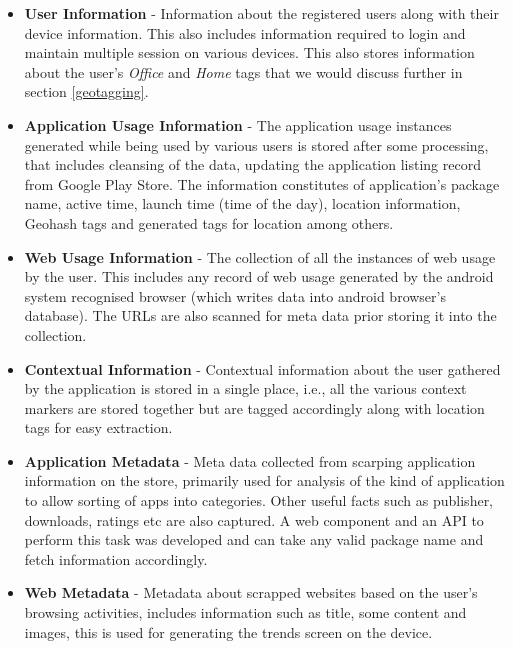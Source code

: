 \documentclass[prodmode,acmtecs]{acmsmall}
\begin{document}
\begin{itemize}

\item \textbf{User Information} - Information about the registered users along with their device information. This also includes information required to login and maintain multiple session on various devices. This also stores information about the user's \textit{Office} and \textit{Home} tags that we would discuss further in section \ref{geotagging}.

\item \textbf{Application Usage Information} - The application usage instances generated while being used by various users is stored after some processing, that includes cleansing of the data, updating the application listing record from Google Play Store. The information constitutes of application's package name, active time, launch time (time of the day), location information, Geohash tags and generated tags for location among others.

\item \textbf{Web Usage Information} - The collection of all the instances of web usage by the user. This includes any record of web usage generated by the android system recognised browser (which writes data into android browser's database). The URLs are also scanned for meta data prior storing it into the collection.

\item \textbf{Contextual Information} - Contextual information about the user gathered by the application is stored in a single place, i.e., all the various context markers are stored together but are tagged accordingly along with location tags for easy extraction.

\item \textbf{Application Metadata} - Meta data collected from scarping application information on the store, primarily used for analysis of the kind of application to allow sorting of apps into categories. Other useful facts such as publisher, downloads, ratings etc are also captured. A web component and an API to perform this task was developed and can take any valid package name and fetch information accordingly.

\item \textbf{Web Metadata} - Metadata about scrapped websites based on the user's browsing activities, includes information such as title, some content and images, this is used for generating the trends screen on the device.

\end{itemize}
\end{document}
